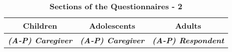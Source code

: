 \begin{table}
\caption{\textbf{Sections of the Questionnaires - 2}}
\scriptsize
\label{tab:SecQuest2}
\begin{center}
\tiny
\begin{tabular}{ c c c }
\hline\hline
\textbf{Children} & \textbf{Adolescents} & \textbf{Adults}\\
\hline
\textbf{\textit{(A-P) Caregiver}} & \textbf{\textit{(A-P) Caregiver}} & \textbf{\textit{(A-P) Respondent}}\\

\end{tabular}
\end{center}
\end{table}
